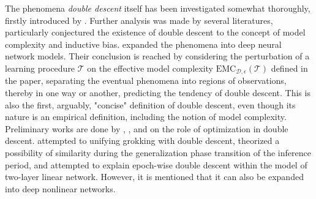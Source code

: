 \documentclass[10pt]{article}
\begin{document}
The phenomena \textit{double descent} itself has been investigated somewhat thoroughly, firstly introduced by \cite{belkin_reconciling_2019}. Further analysis was made by several literatures, particularly conjectured the existence of double descent to the concept of model complexity and inductive bias. \cite{nakkiran_deep_2019} expanded the phenomena into deep neural network models. Their conclusion is reached by considering the perturbation of a learning procedure $\mathcal{T}$ on the effective model complexity $\mathrm{EMC}_{\mathcal{D},\epsilon}(\mathcal{T})$ defined in the paper, separating the eventual phenomena into regions of observations, thereby in one way or another, predicting the tendency of double descent. This is also the first, arguably, "concise" definition of double descent, even though its nature is an empirical definition, including the notion of model complexity. Preliminary works are done by \cite{lafon_understanding_2024}, \cite{schaeffer_double_2023}, and \cite{liu2023understandingroleoptimizationdouble} on the role of optimization in double descent. \cite{davies_unifying_2023} attempted to unifying grokking with double descent, theorized a possibility of similarity during the generalization phase transition of the inference period, and \cite{olmin2024understandingepochwisedoubledescent} attempted to explain epoch-wise double descent within the model of two-layer linear network. However, it is mentioned that it can also be expanded into deep nonlinear networks. 
\end{document}
